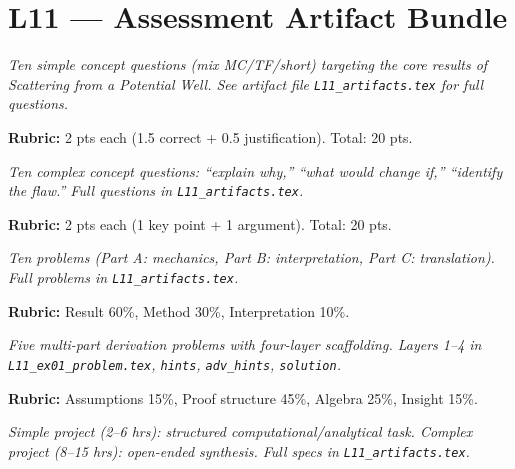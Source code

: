 \newpage
\section*{L11 — Assessment Artifact Bundle}

\begin{tcolorbox}[ugconceptbox, title={SCQU · L11 · Tiers 1–3 · 15–20 min}]
\textit{Ten simple concept questions (mix MC/TF/short) targeting the core results
of Scattering from a Potential Well. See artifact file \texttt{L11_artifacts.tex} for full questions.}

\textbf{Rubric:} 2 pts each (1.5 correct + 0.5 justification). Total: 20 pts.
\end{tcolorbox}

\begin{tcolorbox}[ugconceptbox, title={CCQU · L11 · Tiers 2–3 · 25–35 min}]
\textit{Ten complex concept questions: ``explain why,'' ``what would change if,''
``identify the flaw.'' Full questions in \texttt{L11_artifacts.tex}.}

\textbf{Rubric:} 2 pts each (1 key point + 1 argument). Total: 20 pts.
\end{tcolorbox}

\begin{tcolorbox}[ugprobbox, title={SPSU · L11 · Tiers 1–3 · 60–90 min}]
\textit{Ten problems (Part A: mechanics, Part B: interpretation, Part C: translation).
Full problems in \texttt{L11_artifacts.tex}.}

\textbf{Rubric:} Result 60\%, Method 30\%, Interpretation 10\%.
\end{tcolorbox}

\begin{tcolorbox}[ugprobbox, title={CPSU · L11 · Tier 3 · 3–6 hrs (4-layer)}]
\textit{Five multi-part derivation problems with four-layer scaffolding.
Layers 1–4 in \texttt{L11_ex01\_problem.tex}, \texttt{hints}, \texttt{adv\_hints}, \texttt{solution}.}

\textbf{Rubric:} Assumptions 15\%, Proof structure 45\%, Algebra 25\%, Insight 15\%.
\end{tcolorbox}

\begin{tcolorbox}[ugprobbox, title={SPJU + CPJU · L11 · Tiers 2–3}]
\textit{Simple project (2–6 hrs): structured computational/analytical task.
Complex project (8–15 hrs): open-ended synthesis.
Full specs in \texttt{L11_artifacts.tex}.}
\end{tcolorbox}


